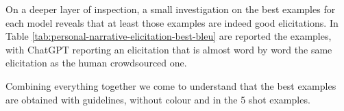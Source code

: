 
On a deeper layer of inspection, a small investigation on the best examples for each model reveals that at least those examples are indeed good elicitations. In Table \ref{tab:personal-narrative-elicitation-best-bleu} are reported the examples, with ChatGPT reporting an elicitation that is almost word by word the same elicitation as the human crowdsourced one.

Combining everything together we come to understand that the best examples are obtained with guidelines, without colour and in the 5 shot examples. %